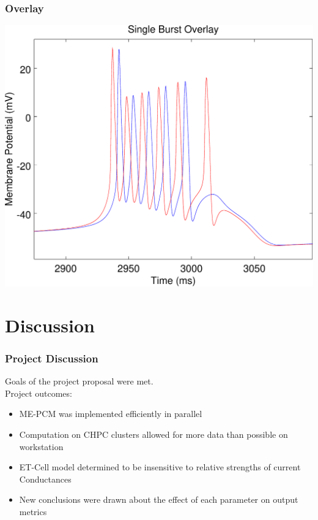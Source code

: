 \documentclass{beamer}
\theoremstyle{plain}
\theoremstyle{definition}
\begin{document}
\begin{frame}\frametitle{Overlay}
  \begin{center}
    \includegraphics[scale=.5]{SingleBurstOverlay.pdf}%
  \end{center}
\end{frame}

\section{Discussion}

\begin{frame}\frametitle{Project Discussion}
  Goals of the project proposal were met.\\
  \vspace{1em}
  Project outcomes:
  \begin{itemize}
    \item ME-PCM was implemented efficiently in parallel
    \item Computation on CHPC clusters allowed for more data than possible on workstation
    \item ET-Cell model determined to be insensitive to relative strengths of current Conductances
    \item New conclusions were drawn about the effect of each parameter on output metrics
  \end{itemize}
\end{frame}
\end{document}
